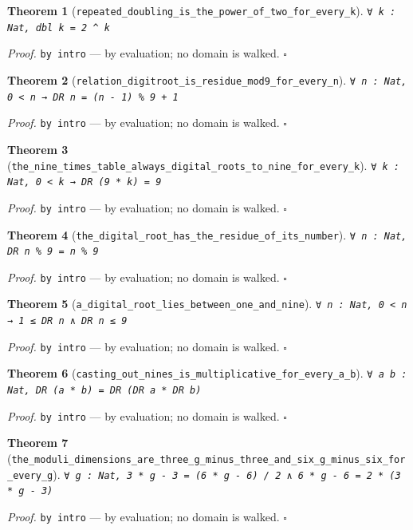 \documentclass[11pt]{article}
\newtheorem{theorem}{Theorem}[section]
\begin{document}
\begin{theorem}[\texttt{repeated\_doubling\_is\_the\_power\_of\_two\_for\_every\_k}]
\texttt{∀ k : Nat, dbl k = 2 ^ k}
\end{theorem}
\noindent\emph{Proof.} \texttt{by
  intro} --- by evaluation; no domain is walked. \hfill$\square$

\begin{theorem}[\texttt{relation\_digitroot\_is\_residue\_mod9\_for\_every\_n}]
\texttt{∀ n : Nat, 0 < n → DR n = (n - 1) \% 9 + 1}
\end{theorem}
\noindent\emph{Proof.} \texttt{by
  intro} --- by evaluation; no domain is walked. \hfill$\square$

\begin{theorem}[\texttt{the\_nine\_times\_table\_always\_digital\_roots\_to\_nine\_for\_every\_k}]
\texttt{∀ k : Nat, 0 < k → DR (9 * k) = 9}
\end{theorem}
\noindent\emph{Proof.} \texttt{by
  intro} --- by evaluation; no domain is walked. \hfill$\square$

\begin{theorem}[\texttt{the\_digital\_root\_has\_the\_residue\_of\_its\_number}]
\texttt{∀ n : Nat, DR n \% 9 = n \% 9}
\end{theorem}
\noindent\emph{Proof.} \texttt{by
  intro} --- by evaluation; no domain is walked. \hfill$\square$

\begin{theorem}[\texttt{a\_digital\_root\_lies\_between\_one\_and\_nine}]
\texttt{∀ n : Nat, 0 < n → 1 ≤ DR n ∧ DR n ≤ 9}
\end{theorem}
\noindent\emph{Proof.} \texttt{by
  intro} --- by evaluation; no domain is walked. \hfill$\square$

\begin{theorem}[\texttt{casting\_out\_nines\_is\_multiplicative\_for\_every\_a\_b}]
\texttt{∀ a b : Nat, DR (a * b) = DR (DR a * DR b)}
\end{theorem}
\noindent\emph{Proof.} \texttt{by
  intro} --- by evaluation; no domain is walked. \hfill$\square$

\begin{theorem}[\texttt{the\_moduli\_dimensions\_are\_three\_g\_minus\_three\_and\_six\_g\_minus\_six\_for\_every\_g}]
\texttt{∀ g : Nat, 3 * g - 3 = (6 * g - 6) / 2 ∧ 6 * g - 6 = 2 * (3 * g - 3)}
\end{theorem}
\noindent\emph{Proof.} \texttt{by
  intro} --- by evaluation; no domain is walked. \hfill$\square$
\end{document}
